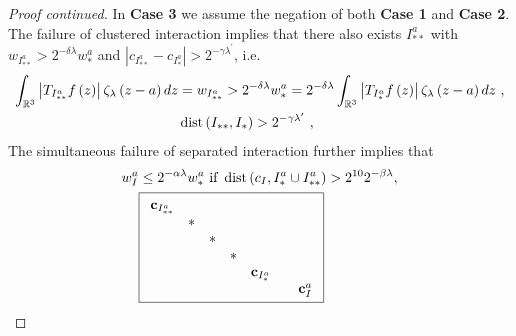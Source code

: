 \documentclass{amsart}%
\theoremstyle{plain}
\numberwithin{equation}{section}
\begin{document}
\begin{proof}
[Proof continued]In \textbf{Case 3} we assume the negation of both
\textbf{Case 1} and \textbf{Case 2}. The failure of clustered interaction
implies that there also exists $I_{\ast\ast}^{a}$ with $w_{I_{\ast\ast}^{a}%
}>2^{-\delta\lambda}w_{\ast}^{a}$ and $\left\vert c_{I_{\ast\ast}^{a}%
}-c_{I_{\ast}^{a}}\right\vert >2^{-\gamma\lambda^{\prime}}$, i.e.%
\begin{align*}
\int_{\mathbb{R}^{3}}\left\vert T_{I_{\ast\ast}^{a}}f\left(  z\right)
\right\vert \zeta_{\lambda}\left(  z-a\right)  dz &  =w_{I_{\ast\ast}^{a}%
}>2^{-\delta\lambda}w_{\ast}^{a}=2^{-\delta\lambda}\int_{\mathbb{R}^{3}%
}\left\vert T_{I_{\ast}^{a}}f\left(  z\right)  \right\vert \zeta_{\lambda
}\left(  z-a\right)  dz\ ,\\
&  \mathop{\rm dist}\left(  I_{\ast\ast},I_{\ast}\right)  >2^{-\gamma
\lambda^{\prime}}\ ,
\end{align*}
The simultaneous failure of separated interaction further implies that%
\begin{align}
w_{I}^{a} &  \leq2^{-\alpha\lambda}w_{\ast}^{a}\text{ if }%
\mathop{\rm dist}\left(  c_{I},I_{\ast}^{a}\cup I_{\ast\ast}^{a}\right)
>2^{10}2^{-\beta\lambda},\label{simul}\\
&  \fbox{$%
\begin{array}
[c]{ccccccc}%
\mathbf{c}_{I_{\ast\ast}^{a}} &  &  &  &  &  & \\
& \ast &  &  &  &  & \\
&  & \ast &  &  &  & \\
&  &  & \ast &  &  & \\
&  &  &  & \mathbf{c}_{I_{\ast}^{a}} &  & \\
&  &  &  &  &  & \mathbf{c}_{I}^{a}%
\end{array}
$}\nonumber
\end{align}



\end{proof}
\end{document}
